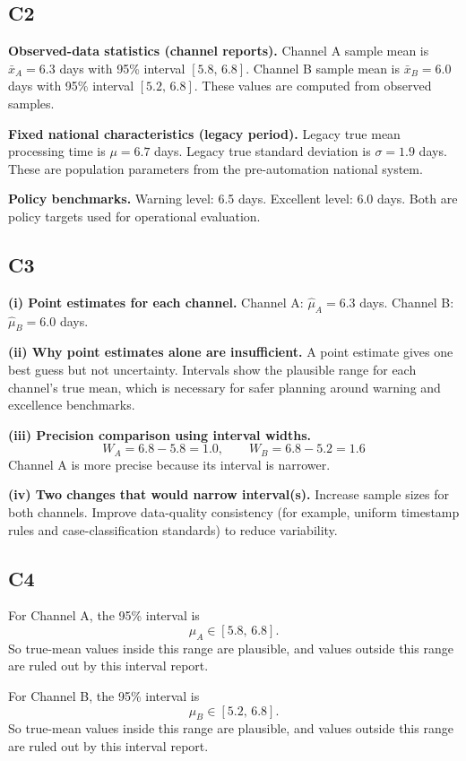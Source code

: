 \begin{ExamProblems}
		\subsection*{C2}
		\textbf{Observed-data statistics (channel reports).}
		Channel A sample mean is $\bar{x}_A=6.3$ days with 95\% interval $[5.8,\,6.8]$.
		Channel B sample mean is $\bar{x}_B=6.0$ days with 95\% interval $[5.2,\,6.8]$.
		These values are computed from observed samples.
		
		\textbf{Fixed national characteristics (legacy period).}
		Legacy true mean processing time is $\mu=6.7$ days.
		Legacy true standard deviation is $\sigma=1.9$ days.
		These are population parameters from the pre-automation national system.
		
		\textbf{Policy benchmarks.}
		Warning level: 6.5 days.
		Excellent level: 6.0 days.
		Both are policy targets used for operational evaluation.
		
		\subsection*{C3}
		\textbf{(i) Point estimates for each channel.}
		Channel A: $\hat{\mu}_A=6.3$ days.
		Channel B: $\hat{\mu}_B=6.0$ days.
		
		\textbf{(ii) Why point estimates alone are insufficient.}
		A point estimate gives one best guess but not uncertainty.
		Intervals show the plausible range for each channel's true mean, which is necessary for safer planning around warning and excellence benchmarks.
		
		\textbf{(iii) Precision comparison using interval widths.}
		\[
		W_A=6.8-5.8=1.0,\qquad W_B=6.8-5.2=1.6
		\]
		Channel A is more precise because its interval is narrower.
		
		\textbf{(iv) Two changes that would narrow interval(s).}
		Increase sample sizes for both channels.
		Improve data-quality consistency (for example, uniform timestamp rules and case-classification standards) to reduce variability.
		
		\subsection*{C4}
		For Channel A, the 95\% interval is
		\[
		\mu_A\in[5.8,\,6.8].
		\]
		So true-mean values inside this range are plausible, and values outside this range are ruled out by this interval report.
		
		For Channel B, the 95\% interval is
		\[
		\mu_B\in[5.2,\,6.8].
		\]
		So true-mean values inside this range are plausible, and values outside this range are ruled out by this interval report.
		

\end{ExamProblems}
